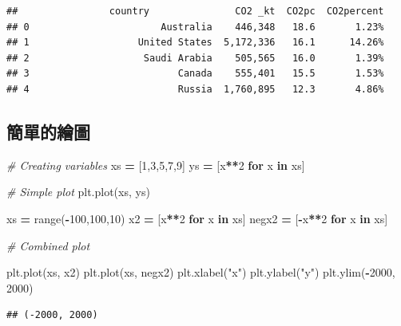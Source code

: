 \documentclass[]{book}
\newenvironment{Shaded}{\begin{snugshade}}{\end{snugshade}}
\newcommand{\BuiltInTok}[1]{#1}
\newcommand{\CommentTok}[1]{\textcolor[rgb]{0.56,0.35,0.01}{\textit{#1}}}
\newcommand{\ControlFlowTok}[1]{\textcolor[rgb]{0.13,0.29,0.53}{\textbf{#1}}}
\newcommand{\DecValTok}[1]{\textcolor[rgb]{0.00,0.00,0.81}{#1}}
\newcommand{\KeywordTok}[1]{\textcolor[rgb]{0.13,0.29,0.53}{\textbf{#1}}}
\newcommand{\NormalTok}[1]{#1}
\newcommand{\OperatorTok}[1]{\textcolor[rgb]{0.81,0.36,0.00}{\textbf{#1}}}
\newcommand{\StringTok}[1]{\textcolor[rgb]{0.31,0.60,0.02}{#1}}
\begin{document}
\begin{verbatim}
##                country               CO2 _kt  CO2pc  CO2percent
## 0                       Australia    446,348   18.6       1.23%
## 1                   United States  5,172,336   16.1      14.26%
## 2                    Saudi Arabia    505,565   16.0       1.39%
## 3                          Canada    555,401   15.5       1.53%
## 4                          Russia  1,760,895   12.3       4.86%
\end{verbatim}

\hypertarget{section-9}{%
\subsection{簡單的繪圖}\label{section-9}}

\begin{Shaded}
\begin{Highlighting}[]
\CommentTok{# Creating variables}
\NormalTok{xs }\OperatorTok{=}\NormalTok{ [}\DecValTok{1}\NormalTok{,}\DecValTok{3}\NormalTok{,}\DecValTok{5}\NormalTok{,}\DecValTok{7}\NormalTok{,}\DecValTok{9}\NormalTok{]}
\NormalTok{ys }\OperatorTok{=}\NormalTok{ [x}\OperatorTok{**}\DecValTok{2} \ControlFlowTok{for}\NormalTok{ x }\KeywordTok{in}\NormalTok{ xs]}

\CommentTok{# Simple plot}
\NormalTok{plt.plot(xs, ys)}

\NormalTok{xs }\OperatorTok{=} \BuiltInTok{range}\NormalTok{(}\OperatorTok{-}\DecValTok{100}\NormalTok{,}\DecValTok{100}\NormalTok{,}\DecValTok{10}\NormalTok{)}
\NormalTok{x2 }\OperatorTok{=}\NormalTok{ [x}\OperatorTok{**}\DecValTok{2} \ControlFlowTok{for}\NormalTok{ x }\KeywordTok{in}\NormalTok{ xs]}
\NormalTok{negx2 }\OperatorTok{=}\NormalTok{ [}\OperatorTok{-}\NormalTok{x}\OperatorTok{**}\DecValTok{2} \ControlFlowTok{for}\NormalTok{ x }\KeywordTok{in}\NormalTok{ xs]}

\CommentTok{# Combined plot}

\NormalTok{plt.plot(xs, x2)}
\NormalTok{plt.plot(xs, negx2)}
\NormalTok{plt.xlabel(}\StringTok{"x"}\NormalTok{)}
\NormalTok{plt.ylabel(}\StringTok{"y"}\NormalTok{)}
\NormalTok{plt.ylim(}\OperatorTok{-}\DecValTok{2000}\NormalTok{, }\DecValTok{2000}\NormalTok{)}
\end{Highlighting}
\end{Shaded}

\begin{verbatim}
## (-2000, 2000)
\end{verbatim}
\end{document}
